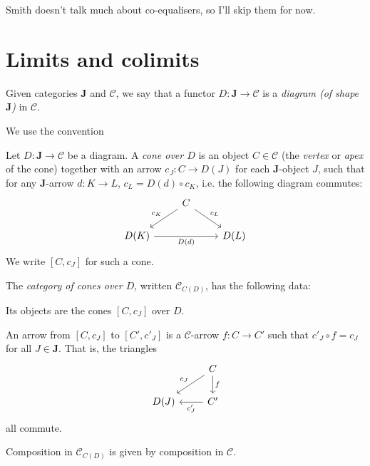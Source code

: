 \documentclass[article, a4paper, 11pt, oneside]{memoir}
\numberwithin{equation}{chapter}
\newcommand{\cat}[1]{\mathcal{#1}}
\newcommand{\scat}[1]{\mathbf{#1}} %
\newcommand{\catC}{\cat{C}}
\newcommand{\scatJ}{\scat{J}}
\begin{document}

Smith doesn't talk much about co-equalisers, so I'll skip them for now.


\chapter{Limits and colimits}

\begin{definition}[Diagrams]
    Given categories $\scatJ$ and $\catC$, we say that a functor $D \colon \scatJ \to \catC$ is a \emph{diagram (of shape $\scatJ$)} in $\catC$.
\end{definition}

\begin{remark}
    We use the convention 
\end{remark}


\begin{definition}[Cones]
    Let $D \colon \scatJ \to \catC$ be a diagram. A \emph{cone over $D$} is an object $C \in \catC$ (the \emph{vertex} or \emph{apex} of the cone) together with an arrow $c_J \colon C \to D(J)$ for each $\scatJ$-object $J$, such that for any $\scatJ$-arrow $d \colon K \to L$, $c_L = D(d) \circ c_K$, i.e. the following diagram commutes:
    \begin{equation*}
        \begin{tikzcd}
            & C
                \ar[dl, "c_K", swap]
                \ar[dr, "c_L"]
            \\
            D(K)
                \ar[rr, "D(d)", swap]
            & & D(L)
        \end{tikzcd}
    \end{equation*}
    We write $[C, c_J]$ for such a cone.

    The \emph{category of cones over $D$}, written $\catC_{C(D)}$, has the following data:
    \begin{enumdef}
        \item Its objects are the cones $[C, c_J]$ over $D$.
        
        \item An arrow from $[C, c_J]$ to $[C', c'_J]$ is a $\catC$-arrow $f \colon C \to C'$ such that $c'_J \circ f = c_J$ for all $J \in \scatJ$. That is, the triangles
        \begin{equation*}
            \begin{tikzcd}
                & C
                    \ar[dl, "c_J", swap]
                    \ar[d, "f"]
                \\
                D(J)
                & C'
                    \ar[l, "c'_J"]
            \end{tikzcd}
        \end{equation*}
        all commute.
    \end{enumdef}
    Composition in $\catC_{C(D)}$ is given by composition in $\catC$.
\end{definition}
\end{document}
